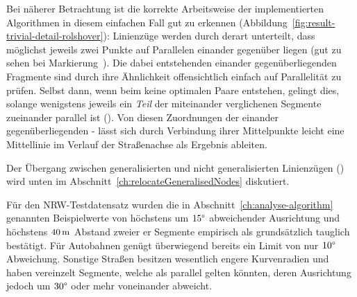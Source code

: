 \documentclass[../main/thesis.tex]{subfiles}
\begin{document}
Bei näherer Betrachtung ist die korrekte Arbeitsweise der implementierten Algorithmen in diesem einfachen Fall gut zu erkennen (Abbildung~\ref{fig:result-trivial-detail-rolshover}):
Linienzüge werden durch  derart unterteilt, dass möglichst jeweils zwei Punkte auf Parallelen einander gegenüber liegen (gut zu sehen bei Markierung~).
Die dabei entstehenden einander gegenüberliegenden Fragmente sind durch ihre Ähnlichkeit offensichtlich einfach auf Parallelität zu prüfen.
Selbst dann, wenn beim  keine optimalen Paare entstehen, gelingt dies, solange wenigstens jeweils ein \emph{Teil} der miteinander verglichenen Segmente zueinander parallel ist ().
Von diesen Zuordnungen der einander gegenüberliegenden \osm- lässt sich durch Verbindung ihrer Mittelpunkte leicht eine Mittellinie im Verlauf der Straßenachse als Ergebnis ableiten.


Der Übergang zwischen generalisierten und nicht generalisierten Linienzügen () wird unten im Abschnitt~\ref{ch:relocateGeneralisedNodes} diskutiert.

Für den NRW-Testdatensatz wurden die in Abschnitt~\ref{ch:analyse-algorithm} genannten Beispielwerte von höchstens um $15\degree$ abweichender Ausrichtung und höchstens $\unit[40]{m}$ Abstand zweier er Segmente empirisch als grundsätzlich tauglich bestätigt.
Für Autobahnen genügt überwiegend bereits ein Limit von nur $10\degree$ Abweichung.
Sonstige Straßen besitzen wesentlich engere Kurvenradien und haben vereinzelt Segmente, welche als parallel gelten könnten, deren Ausrichtung jedoch um $30\degree$ oder mehr voneinander abweicht.
\end{document}
